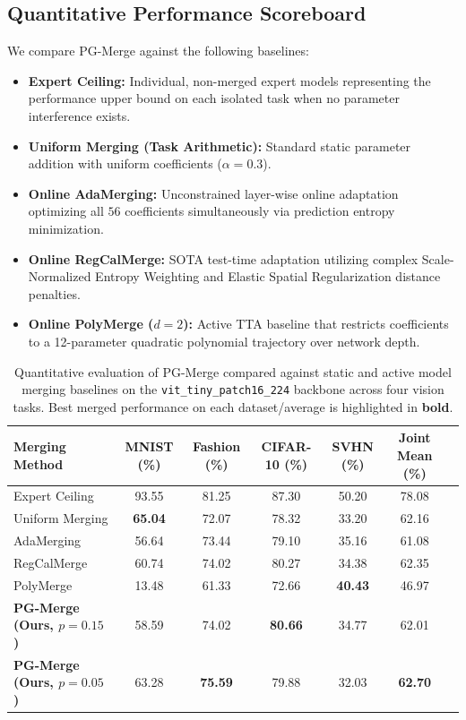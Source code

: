 \subsection{Quantitative Performance Scoreboard}
We compare PG-Merge against the following baselines:
\begin{itemize}
    \item \textbf{Expert Ceiling:} Individual, non-merged expert models representing the performance upper bound on each isolated task when no parameter interference exists.
    \item \textbf{Uniform Merging (Task Arithmetic):} Standard static parameter addition with uniform coefficients ($\alpha = 0.3$).
    \item \textbf{Online AdaMerging:} Unconstrained layer-wise online adaptation optimizing all $56$ coefficients simultaneously via prediction entropy minimization.
    \item \textbf{Online RegCalMerge:} SOTA test-time adaptation utilizing complex Scale-Normalized Entropy Weighting and Elastic Spatial Regularization distance penalties.
    \item \textbf{Online PolyMerge ($d=2$):} Active TTA baseline that restricts coefficients to a 12-parameter quadratic polynomial trajectory over network depth.
\end{itemize}

\begin{table}[t]
\caption{Quantitative evaluation of PG-Merge compared against static and active model merging baselines on the \texttt{vit\_tiny\_patch16\_224} backbone across four vision tasks. Best merged performance on each dataset/average is highlighted in \textbf{bold}.}
\label{tab:scoreboard}
\vskip 0.15in
\begin{center}
\begin{small}
\begin{sc}
\begin{tabular}{lcccccr}
\toprule
Merging Method & MNIST (\%) & Fashion (\%) & CIFAR-10 (\%) & SVHN (\%) & Joint Mean (\%) \\
\midrule
Expert Ceiling  & 93.55 & 81.25 & 87.30 & 50.20 & 78.08 \\
\midrule
Uniform Merging & \textbf{65.04} & 72.07 & 78.32 & 33.20 & 62.16 \\
AdaMerging      & 56.64 & 73.44 & 79.10 & 35.16 & 61.08 \\
RegCalMerge     & 60.74 & 74.02 & 80.27 & 34.38 & 62.35 \\
PolyMerge       & 13.48 & 61.33 & 72.66 & \textbf{40.43} & 46.97 \\
\midrule
\textbf{PG-Merge (Ours, $p=0.15$)} & 58.59 & 74.02 & \textbf{80.66} & 34.77 & 62.01 \\
\textbf{PG-Merge (Ours, $p=0.05$)} & 63.28 & \textbf{75.59} & 79.88 & 32.03 & \textbf{62.70} \\
\bottomrule
\end{tabular}
\end{sc}
\end{small}
\end{center}
\vskip -0.1in
\end{table}

